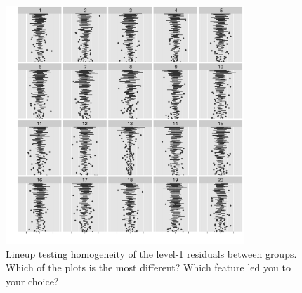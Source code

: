 \documentclass[12pt]{article} %
\begin{document}
\begin{figure}[hbt]
	\centering
	\includegraphics[width=0.8\textwidth]{cyclone-13.pdf}
	\caption{\label{fig:badcyclone} 
	Lineup testing homogeneity of the level-1 residuals between groups. Which of the plots is the most different? Which feature led you to your choice?}
\end{figure}
\end{document}
